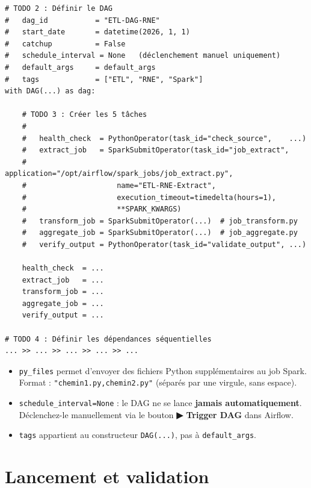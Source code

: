 \documentclass[11pt,a4paper]{article}
\begin{document}
\begin{lstlisting}
# TODO 2 : Définir le DAG
#   dag_id           = "ETL-DAG-RNE"
#   start_date       = datetime(2026, 1, 1)
#   catchup          = False
#   schedule_interval = None   (déclenchement manuel uniquement)
#   default_args     = default_args
#   tags             = ["ETL", "RNE", "Spark"]
with DAG(...) as dag:

    # TODO 3 : Créer les 5 tâches
    #
    #   health_check  = PythonOperator(task_id="check_source",    ...)
    #   extract_job   = SparkSubmitOperator(task_id="job_extract",
    #                     application="/opt/airflow/spark_jobs/job_extract.py",
    #                     name="ETL-RNE-Extract",
    #                     execution_timeout=timedelta(hours=1),
    #                     **SPARK_KWARGS)
    #   transform_job = SparkSubmitOperator(...)  # job_transform.py
    #   aggregate_job = SparkSubmitOperator(...)  # job_aggregate.py
    #   verify_output = PythonOperator(task_id="validate_output", ...)

    health_check  = ...
    extract_job   = ...
    transform_job = ...
    aggregate_job = ...
    verify_output = ...

# TODO 4 : Définir les dépendances séquentielles
... >> ... >> ... >> ... >> ...
\end{lstlisting}

\begin{hint}
\begin{itemize}[leftmargin=*]
  \item \texttt{py\_files} permet d'envoyer des fichiers Python supplémentaires au job Spark.\\
        Format : \texttt{"chemin1.py,chemin2.py"} (séparés par une virgule, sans espace).
  \item \texttt{schedule\_interval=None} : le DAG ne se lance \textbf{jamais automatiquement}.\\
        Déclenchez-le manuellement via le bouton \textbf{▶ Trigger DAG} dans Airflow.
  \item \texttt{tags} appartient au constructeur \texttt{DAG(...)}, pas à \texttt{default\_args}.
\end{itemize}
\end{hint}

\section{Lancement et validation}
\end{document}

